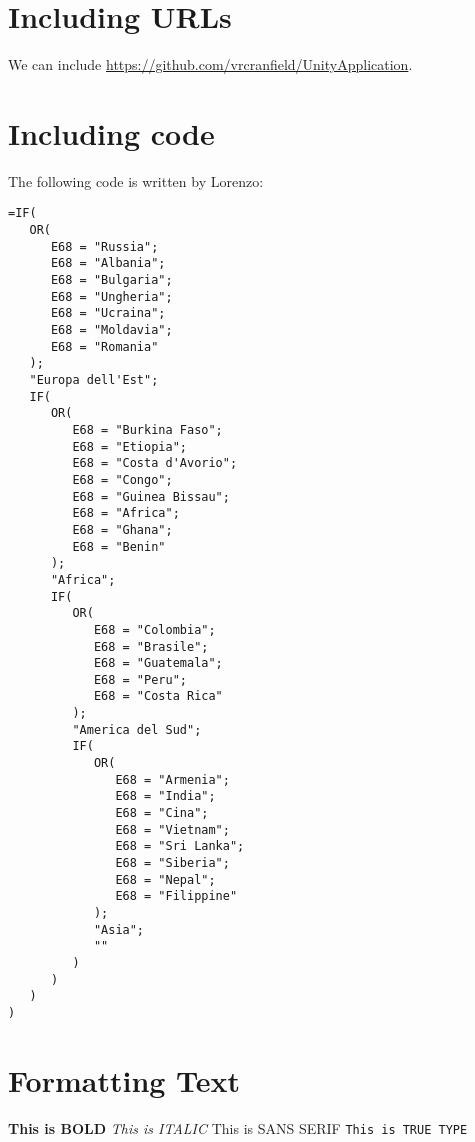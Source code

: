 \section{Including URLs}
We can include \url{https://github.com/vrcranfield/UnityApplication}.

\section{Including code}
The following code is written by Lorenzo:

%			

\begin{minipage}{\linewidth}
\begin{lstlisting}
=IF(
   OR(
      E68 = "Russia";
      E68 = "Albania";
      E68 = "Bulgaria";
      E68 = "Ungheria";
      E68 = "Ucraina";
      E68 = "Moldavia";
      E68 = "Romania"
   );
   "Europa dell'Est";
   IF(
      OR(
         E68 = "Burkina Faso";
         E68 = "Etiopia";
         E68 = "Costa d'Avorio";
         E68 = "Congo";
         E68 = "Guinea Bissau";
         E68 = "Africa";
         E68 = "Ghana";
         E68 = "Benin"
      );
      "Africa";
      IF(
         OR(
            E68 = "Colombia";
            E68 = "Brasile";
            E68 = "Guatemala";
            E68 = "Peru";
            E68 = "Costa Rica"
         );
         "America del Sud";
         IF(
            OR(
               E68 = "Armenia";
               E68 = "India";
               E68 = "Cina";
               E68 = "Vietnam";
               E68 = "Sri Lanka";
               E68 = "Siberia";
               E68 = "Nepal";
               E68 = "Filippine"
            );
            "Asia";
            ""
         )
      )
   )
)
\end{lstlisting}\label{code:nationality}
\end{minipage}

\section{Formatting Text}
\textbf{This is BOLD}
\textit{This is ITALIC}
\textsf{This is SANS SERIF}
\texttt{This is TRUE TYPE}

